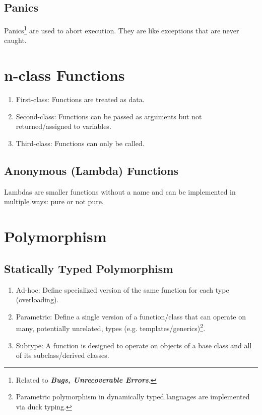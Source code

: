 \documentclass{article}
\begin{document}
\subsection{Panics}
Panics\footnote{Related to \textit{\textbf{Bugs, Unrecoverable
      Errors}}.} are used to abort execution. They are like exceptions
that are never caught.





\section{n-class Functions}
\begin{enumerate}[label=(\roman*)]
\item First-class: Functions are treated as data.
\item Second-class: Functions can be passed as arguments but not
  returned/assigned to variables.
\item Third-class: Functions can only be called.
\end{enumerate}

\subsection{Anonymous (Lambda) Functions}
Lambdas are smaller functions without a name and can be implemented in
multiple ways: pure or not pure.





\section{Polymorphism}
\subsection{Statically Typed Polymorphism}
\begin{enumerate}[label=(\roman*)]
\item Ad-hoc: Define specialized version of the same function for each
  type (overloading).
\item Parametric: Define a single version of a function/class that can
  operate on many, potentially unrelated, types
  (e.g. templates/generics)\footnote{Parametric polymorphism in
    dynamically typed languages are implemented via duck typing.}.
\item Subtype: A function is designed to operate on objects of a base
  class and all of its subclass/derived classes.
\end{enumerate}
\end{document}
